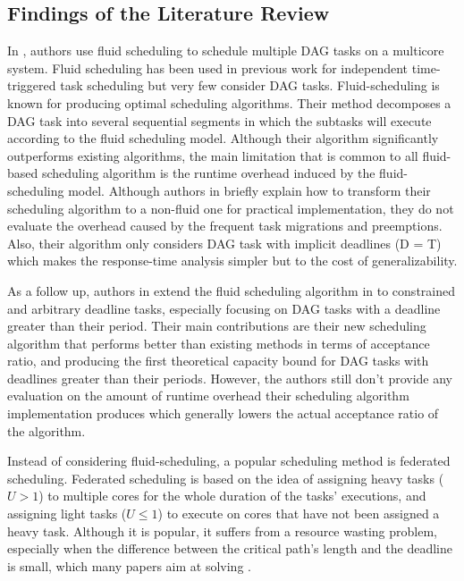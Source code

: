 \subsection{Findings of the Literature Review}
 
In \cite{guan2021DAGfluid}, authors 
use fluid scheduling to schedule multiple DAG tasks
on a multicore system. 
Fluid scheduling has been used in previous work for independent
time-triggered task scheduling\cite{baruah1993PFair}\cite{cho2006LLREF} 
but very few consider DAG tasks. Fluid-scheduling is known for producing optimal scheduling algorithms.
Their method decomposes a DAG task into several sequential segments
in which the subtasks will execute according to the fluid scheduling 
model. Although their algorithm significantly outperforms
existing algorithms, the main limitation that is common to all fluid-based
scheduling algorithm is the runtime overhead induced by the fluid-scheduling model.
Although authors in \cite{guan2021DAGfluid} briefly explain how 
to transform their scheduling algorithm to a non-fluid one for practical implementation,
they do not evaluate the overhead caused by the frequent task migrations
and preemptions. Also, their algorithm only considers DAG task with implicit deadlines
(D = T) which makes the response-time analysis simpler but to the cost
of generalizability.

As a follow up, authors in \cite{GuanFluidDag2022} 
extend the fluid scheduling algorithm in \cite{guan2021DAGfluid}
to constrained and arbitrary deadline tasks,
especially focusing on DAG tasks with a deadline greater than their period.
Their main contributions are their new scheduling algorithm that 
performs better than existing methods in terms of acceptance ratio,
and producing the first theoretical capacity bound for DAG tasks
with deadlines greater than their periods.
However, the authors still don't provide any evaluation 
on the amount of runtime overhead their scheduling algorithm implementation
produces which generally lowers the actual acceptance ratio
of the algorithm. 

Instead of considering fluid-scheduling,
a popular scheduling method is federated scheduling.
Federated scheduling is based on the idea
of assigning heavy tasks ($U > 1$) to multiple cores
for the whole duration of the tasks' executions,
and assigning light tasks ($U \le 1$) to execute on
cores that have not been assigned a heavy task.
Although it is popular, it suffers from a resource wasting problem,
especially when the difference between the critical path's length 
and the deadline is small,
which many papers aim at solving
\cite{Guan2023FederatedNew}
\cite{jiangUtilTensityBound}
\cite{JiangVirtuallyFederatedSched2021}
\cite{Jiang2023SchedVirtualProcs}
\cite{Kobayashi2023FedBundledDagsched}
\cite{He2023DegreeOfParallelism}.

